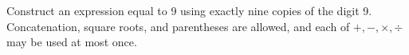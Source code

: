 Construct an expression equal to 9 using exactly nine copies of the digit 9. Concatenation, square roots, and parentheses are allowed, and each of $+,-,\times,\div$ may be used at most once.

